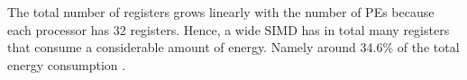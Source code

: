 The total number of registers grows linearly with the number of PEs because each processor has 32 registers. Hence, a wide SIMD has in total many registers that consume a considerable amount of energy. Namely around 34.6\% of the total energy consumption \cite{dongrio1}.








